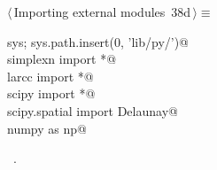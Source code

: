\documentclass[11pt,oneside]{article}	%
\begin{document}
\begin{flushleft} \small \label{scrap75}
\protect{}$\langle\,$Importing external modules\nobreak\ {\footnotesize 38d}$\,\rangle\equiv$
\vspace{-1ex}
\begin{list}{}{} \item
\mbox{}\verb@import sys; sys.path.insert(0, 'lib/py/')@\\
\mbox{}\verb@from simplexn import *@\\
\mbox{}\verb@from larcc import *@\\
\mbox{}\verb@from scipy import *@\\
\mbox{}\verb@from scipy.spatial import Delaunay@\\
\mbox{}\verb@import numpy as np@\\
\mbox{}\verb@@{\NWsep}
\end{list}
\vspace{-1ex}
\footnotesize\addtolength{\baselineskip}{-1ex}
\begin{list}{}{\setlength{\itemsep}{-\parsep}\setlength{\itemindent}{-\leftmargin}}
\item \NWtxtMacroRefIn\ .
\end{list}
\end{flushleft}
\end{document}

